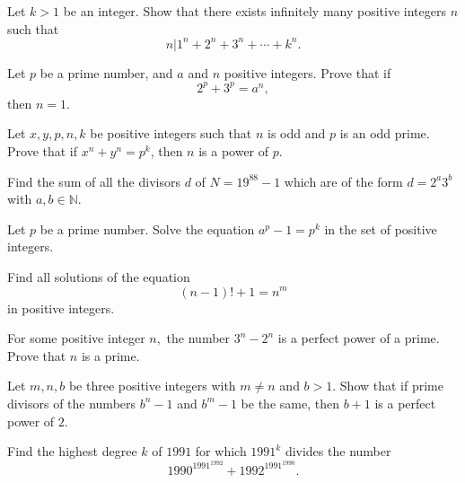 \documentclass{subfile}
\begin{document}
	\begin{problem}
		Let $k>1$ be an integer. Show that there exists infinitely many positive integers $n$ such that
		\[n | 1^n + 2^n +3^n +\cdots+k^n.\]
	\end{problem} 
	
	
	\begin{problem}[Ireland 1996] 
		Let $p$ be a prime number, and $a$ and $n$ positive integers. Prove that if
		\[2^p+3^p=a^n,\]
		then $n=1.$
	\end{problem} 
	
	
	
	\begin{problem}[Russia 1996] 
		Let $x, y, p, n, k$ be positive integers such that $n$ is odd and $p$ is an odd prime. Prove that if $x^n + y^n = p^k$, then $n$ is a power of $p$.
	\end{problem} 
	
	\begin{problem}
		Find the sum of all the divisors $d$ of $N=19^{88}-1$ which are of the form $d=2^{a}3^{b}$ with  $a,b \in \mathbb N$.
	\end{problem} 
	
	\begin{problem}
		Let $p$ be a prime number. Solve the equation $a^p-1 = p^k$ in the set of positive integers.
	\end{problem} 
	
	\begin{problem}
		Find all solutions of the equation
		\[(n-1)! + 1 = n^m\]
		in positive integers.
	\end{problem} 
	
	\begin{problem}[Bulgaria 1997]
		For some positive integer $n,$ the number $3^n-2^n$ is a perfect power of a prime. Prove that $n$ is a prime.
	\end{problem} 
	
	\begin{problem}
		Let $m,n,b$ be three positive integers with $m \neq n$ and $b>1.$ Show that if prime divisors of the numbers $b^n-1$ and $b^m-1$ be the same, then $b+1$ is a perfect power of $2.$
	\end{problem} 
	
	\begin{problem}
		Find the highest degree $ k$ of $ 1991$ for which $ 1991^k$ divides the number \[ 1990^{1991^{1992}} + 1992^{1991^{1990}}.\]
	\end{problem} 
	
\end{document}
